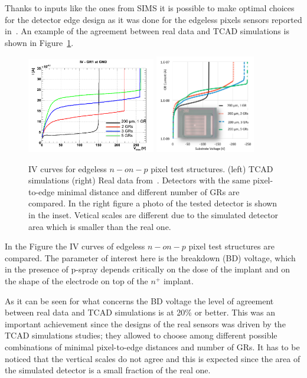 Thanks to inputs like the ones from SIMS it is possible to make optimal choices for the detector 
edge design as it was done for the edgeless pixels sensors reported in~\cite{bib:nim2012}. 
An example of the agreement between real data and TCAD simulations is shown in 
Figure~\ref{fig:IV_BD}.
\begin{figure}[!htbp]
\centering
\includegraphics[width=0.5\textwidth]{IV_simulations}
\includegraphics[width=0.39\textwidth]{newIV_data.pdf}
\caption{\label{fig:IV_BD}IV curves for edgeless $n-on-p$ pixel test structures. (left) TCAD simulations 
(right) Real data from~\cite{bib:nim2012}. Detectors with the same pixel-to-edge minimal distance 
and different number of GRs are compared. In the right figure a photo of the tested detector is 
shown in the inset. Vetical scales are different due to the simulated detector area which is smaller than the real one.}
\end{figure}
In the Figure the IV curves of edgeless $n-on-p$ pixel test structures are compared. The 
parameter of interest here is the breakdown (BD) voltage, which in the presence of 
p-spray depends critically on the dose of the implant and on the shape of the electrode 
on top of the $n^+$ implant. 

As it can be seen for what concerns the BD voltage the level of agreement between real data 
and TCAD simulations is at 20\% or better. This was an important achievement since 
the designs of the real sensors was driven by the TCAD simulations studies; they allowed 
to choose among different possible combinations of minimal pixel-to-edge distances and 
number of GRs. It has to be noticed that the vertical scales do not agree and this is expected since the area of the 
simulated detector is a small fraction of the real one.

